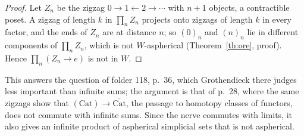 \begin{proof}
Let $Z_n$ be the zigzag $0\to1\leftarrow2\to\cdots$ with $n+1$ objects, a contractible poset. A zigzag of length $k$ in $\prod_n Z_n$ projects onto zigzags of length $k$ in every factor, and the ends of $Z_n$ are at distance $n$; so $(0)_n$ and $(n)_n$ lie in different components of $\prod_n Z_n$, which is not $W$-aspherical (Theorem~\ref{th:ore}, proof). Hence $\prod_n(Z_n\to e)$ is not in $W$.
\end{proof}

This answers the question of folder 118, p.~36, which Grothendieck there judges less important than infinite sums; the argument is that of p.~28, where the same zigzags show that $(\mathrm{Cat})\to\overline{\mathrm{Cat}}$, the passage to homotopy classes of functors, does not commute with infinite sums. Since the nerve commutes with limits, it also gives an infinite product of aspherical simplicial sets that is not aspherical.

